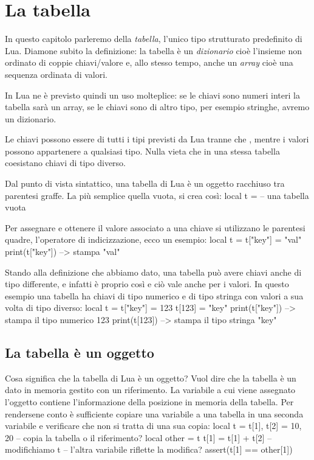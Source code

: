

\chapter{La tabella}
\label{iChTabella}

In questo capitolo parleremo della \emph{tabella}, l'unico tipo strutturato
predefinito di Lua. Diamone subito la definizione: la tabella è un
\emph{dizionario} cioè l'insieme non ordinato di coppie chiavi/valore e, allo
stesso tempo, anche un \emph{array} cioè una sequenza ordinata di valori.

In Lua ne è previsto quindi un uso molteplice: se le chiavi sono numeri interi
la tabella sarà un array, se le chiavi sono di altro tipo, per esempio stringhe,
avremo un dizionario.

Le chiavi possono essere di tutti i tipi previsti da Lua tranne che ,
mentre i valori possono appartenere a qualsiasi tipo. Nulla vieta che in una
stessa tabella coesistano chiavi di tipo diverso.

Dal punto di vista sintattico, una tabella di Lua è un oggetto racchiuso tra
parentesi graffe. La più semplice quella vuota, si crea così:
\lines
local t = {} -- una tabella vuota
\endlines
{}

Per assegnare e ottenere il valore associato a una chiave si utilizzano le
parentesi quadre, l'operatore di indicizzazione, ecco un esempio:
\lines
local t = {}
t["key"] = "val"
print(t["key"]) --> stampa "val"
\endlines
{}

Stando alla definizione che abbiamo dato, una tabella può avere chiavi anche di
tipo differente, e infatti è proprio così e ciò vale anche per i valori. In
questo esempio una tabella ha chiavi di tipo numerico e di tipo stringa con
valori a sua volta di tipo diverso:
\lines
local t = {}
t["key"] = 123
t[123] = "key"
print(t["key"]) --> stampa il tipo numerico 123
print(t[123])   --> stampa il tipo stringa "key"
\endlines
{}


\section{La tabella è un oggetto}

Cosa significa che la tabella di Lua è un oggetto? Vuol dire che la tabella è un
dato in memoria gestito con un riferimento. La variabile a cui viene assegnato
l'oggetto contiene l'informazione della posizione in memoria della tabella. Per
rendersene conto è sufficiente copiare una variabile a una tabella in una
seconda variabile e verificare che non si tratta di una sua copia:
\lines
local t = {}
t[1], t[2] = 10, 20
-- copia la tabella o il riferimento?
local other = t
t[1] = t[1] + t[2] -- modifichiamo t
-- l'altra variabile riflette la modifica?
assert(t[1] == other[1])
\endlines
{}

